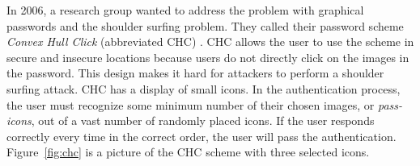     \begin{figure}[H]
      \centering
    \end{figure}

  In 2006, a research group wanted to address the problem with graphical passwords and the shoulder surfing problem. They called their password scheme {\it Convex Hull Click} (abbreviated CHC) \cite{Wiedenbeck}. CHC allows the user to use the scheme in secure and insecure locations because users do not directly click on the images in the password. This design makes it hard for attackers to perform a shoulder surfing attack. CHC has a display of small icons. In the authentication process, the user must recognize some minimum number of their chosen images, or {\it pass-icons}, out of a vast number of randomly placed icons. If the user responds correctly every time in the correct order, the user will pass the authentication. Figure~\ref{fig:chc} is a picture of the CHC scheme with three selected icons.

